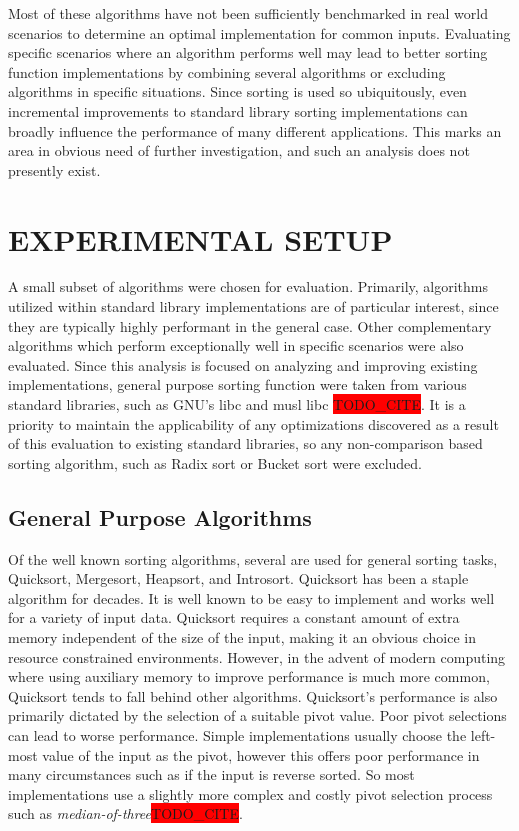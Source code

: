 \documentclass[letter, 12pt, conference]{ieeeconf}
\newcommand{\todocite}{\colorbox{red}{TODO\_CITE}}
\begin{document}
Most of these algorithms have not been sufficiently benchmarked in real world
scenarios to determine an optimal implementation for common inputs. Evaluating
specific scenarios where an algorithm performs well may lead to better sorting
function implementations by combining several algorithms or excluding algorithms
in specific situations. Since sorting is used so ubiquitously, even incremental
improvements to standard library sorting implementations can broadly influence
the performance of many different applications. This marks an area in obvious
need of further investigation, and such an analysis does not presently exist.

\section{EXPERIMENTAL SETUP}

A small subset of algorithms were chosen for evaluation. Primarily, algorithms
utilized within standard library implementations are of particular interest,
since they are typically highly performant in the general case. Other
complementary algorithms which perform exceptionally well in specific scenarios
were also evaluated. Since this analysis is focused on analyzing and improving
existing implementations, general purpose sorting function were taken from
various standard libraries, such as GNU's libc and musl libc \todocite. It is a
priority to maintain the applicability of any optimizations discovered as a
result of this evaluation to existing standard libraries, so any non-comparison
based sorting algorithm, such as Radix sort or Bucket sort were excluded.

\subsection{General Purpose Algorithms}

Of the well known sorting algorithms, several are used for general sorting
tasks, Quicksort, Mergesort, Heapsort, and Introsort. Quicksort has been a
staple algorithm for decades. It is well known to be easy to implement and works
well for a variety of input data. Quicksort requires a constant amount of extra
memory independent of the size of the input, making it an obvious choice in
resource constrained environments. However, in the advent of modern computing
where using auxiliary memory to improve performance is much more common,
Quicksort tends to fall behind other algorithms. Quicksort's performance is also
primarily dictated by the selection of a suitable pivot value. Poor pivot
selections can lead to worse performance. Simple implementations usually choose
the left-most value of the input as the pivot, however this offers poor
performance in many circumstances such as if the input is reverse sorted. So
most implementations use a slightly more complex and costly pivot selection
process such as \textit{median-of-three}\todocite.
\end{document}
